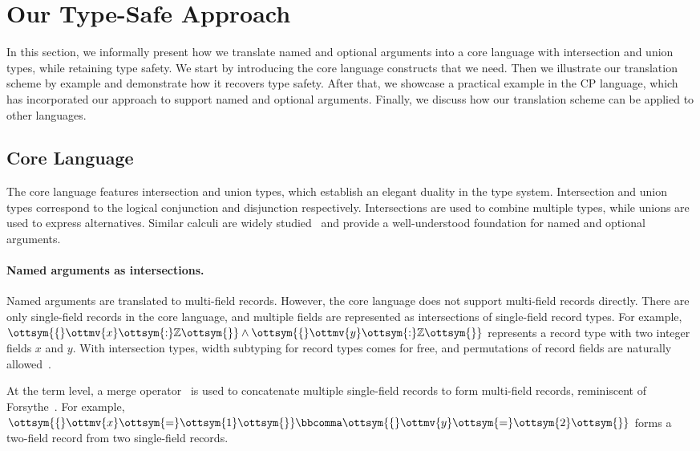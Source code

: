 \section{Our Type-Safe Approach}

In this section, we informally present how we translate named and optional
arguments into a core language with intersection and union types, while
retaining type safety. We start by introducing the core language constructs that
we need. Then we illustrate our translation scheme by example and demonstrate
how it recovers type safety. After that, we showcase a practical example in the
CP language, which has incorporated our approach to support named and optional
arguments. Finally, we discuss how our translation scheme can be applied to
other languages.

\subsection{Core Language} \label{sec:core}

The core language features intersection and union types, which establish an
elegant duality in the type system. Intersection and union types correspond to
the logical conjunction and disjunction respectively. Intersections are used to
combine multiple types, while unions are used to express alternatives. Similar
calculi are widely
studied~\citep{barbanera1995intersection,frisch2008semantic,dunfield2014elaborating}
and provide a well-understood foundation for named and optional arguments.

\paragraph{Named arguments as intersections.}
Named arguments are translated to multi-field records. However, the core
language does not support multi-field records directly. There are only
single-field records in the core language, and multiple fields are represented
as intersections of single-field record types. For example,
$\ottsym{\{}  \ottmv{x}  \ottsym{:}   \mathbb{Z}   \ottsym{\}}  \land  \ottsym{\{}  \ottmv{y}  \ottsym{:}   \mathbb{Z}   \ottsym{\}}$ represents a record type with two integer fields $x$ and
$y$. With intersection types, width subtyping for record types comes for free,
and permutations of record fields are naturally
allowed~\citep{reynolds1997design}.

At the term level, a merge
operator~\citep{dunfield2014elaborating,rehman2023blend} is used to concatenate
multiple single-field records to form multi-field records, reminiscent of
Forsythe~\citep{reynolds1997design}. For example, $\ottsym{\{}  \ottmv{x}  \ottsym{=}  \ottsym{1}  \ottsym{\}}  \bbcomma  \ottsym{\{}  \ottmv{y}  \ottsym{=}  \ottsym{2}  \ottsym{\}}$ forms a
two-field record from two single-field records.

